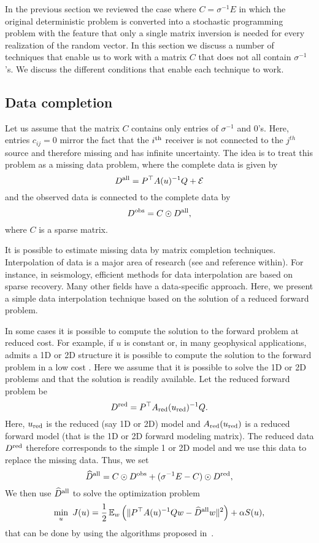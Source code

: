 \documentclass[12pt]{article}
\newcommand{\hf}{\frac12}
\newcommand{\bbE}{\mathbb{E}}
\begin{document}
In the previous section we reviewed the case where $C = \sigma^{-1} E$ in which the original deterministic problem is converted into a stochastic programming problem with the feature that only a single matrix inversion is needed for every realization of the random vector. In this section we discuss a number of techniques that enable us to work with a matrix $C$ that does not all contain $\sigma^{-1}$'s. We discuss the different conditions that enable each technique to work.

\subsection{Data completion}
\label{meth1}
Let us assume that the matrix $C$ contains only entries of $\sigma^{-1}$ and $0$'s. Here, entries $c_{ij} = 0$ mirror the fact that the $i^{\rm th}$ receiver is not connected to the $j^{th}$ source and therefore missing and has infinite uncertainty.
The idea is to treat this problem as a missing data problem, where the complete data is given by
$$ D^{\rm all} =  P^{\top}A(u)^{-1}Q + {\cal E} $$
and the observed data is connected to the complete data by
$$ D^{\rm obs} = C \odot D^{\rm all}, $$
where $C$ is a sparse matrix.

It is possible to estimate missing data by matrix completion techniques. Interpolation of data is a major area of research (see \cite{TradUlrychSacchi2001} and reference within). For instance, in seismology, efficient methods for data interpolation are based on sparse recovery. Many other fields have a data-specific approach. Here, we present a simple data interpolation technique based on the solution of a reduced forward problem.

\bigskip

In some cases it is possible to compute the solution to the forward problem at reduced cost.
For example, if $u$ is constant or, in many geophysical applications, admits a 1D or 2D structure
it is possible to compute the solution to the forward problem in a low cost  \cite{wardhow}.
Here we assume that it is possible to solve the 1D or 2D problems and that the solution is readily available. Let the reduced forward problem be
$$ D^{\rm red} = P^{\top} A_{\rm red}(u_{\rm red})^{-1}Q. $$
Here, $u_{\rm red}$ is the reduced (say 1D or 2D)
model and  $A_{\rm red}(u_{\rm red})$ is a reduced forward
model (that is the 1D or 2D forward modeling matrix). The reduced data $D^{\rm red}$
therefore corresponds to the simple 1 or 2D model and we use this data to replace
the missing data.
Thus, we set
$$ \widehat D^{\rm all} = C \odot D^{\rm obs} + (\sigma^{-1} E-C) \odot D^{\rm red}, $$
 We then use  $\widehat D^{\rm all}$ to solve the optimization problem
\begin{equation} \label{stoproComp}
 \min_{u} \ J(u) =  \hf\, \bbE_{w} \left( \|P^{\top}A(u)^{-1}Qw - \widehat D^{\rm all}w\|^{2} \right) + \alpha S(u),
\end{equation}
that can be done by using  the algorithms proposed in~\cite{HaberChungHerrmann2011}.
\end{document}
